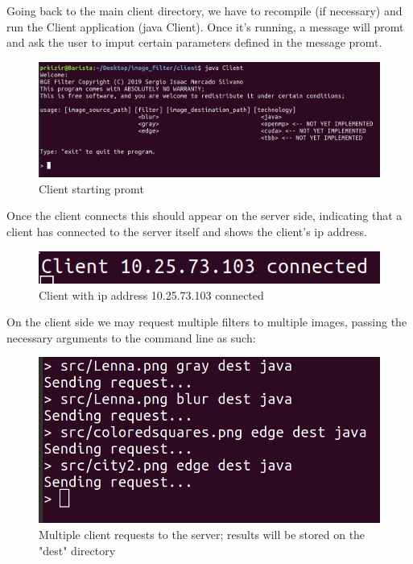 \documentclass[a4paper,12pt]{article}
\begin{document}
	
	Going back to the main client directory, we have to recompile (if necessary) and run the Client application (java Client). Once it's running, a message will promt and ask the user to imput certain parameters defined in the message promt. 
	
	\begin{figure}[H]
		\centering
		\includegraphics[width=\textwidth]{clientinit.png}
		\caption{Client starting promt}
	\end{figure}	
	
	Once the client connects this should appear on the server side, indicating that a client has connected to the server itself and shows the client's ip address.
	
	\begin{figure}[H]
		\centering
		\includegraphics[width=\textwidth]{clientconnected.png}
		\caption{Client with ip address 10.25.73.103 connected}
	\end{figure}	
	
	On the client side we may request multiple filters to multiple images, passing the necessary arguments to the command line as such:
	
	\begin{figure}[H]
		\centering
		\includegraphics[width=\textwidth]{requestsclient.png}
		\caption{Multiple client requests to the server; results will be stored on the "dest" directory}
	\end{figure}	
	
\end{document}
